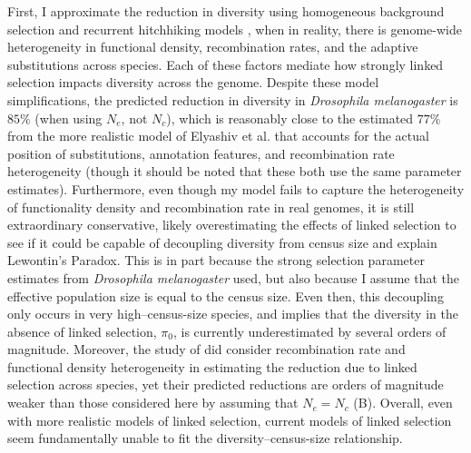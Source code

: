 \documentclass[9pt,lineno]{elife}
\begin{document}
First, I approximate the reduction in diversity using homogeneous background
selection and recurrent hitchhiking models
\citep{Kaplan1989-sc,Hudson1995-xc,Coop2012-cd}, when in reality, there is
genome-wide heterogeneity in functional density, recombination rates, and the
adaptive substitutions across species. Each of these factors mediate how
strongly linked selection impacts diversity across the genome. Despite these
model simplifications, the predicted reduction in diversity in \emph{Drosophila
melanogaster} is $85\%$ (when using $N_e$, not $N_c$), which is reasonably
close to the estimated $77\%$ from the more realistic model of Elyashiv et al.
that accounts for the actual position of substitutions, annotation features,
and recombination rate heterogeneity (though it should be noted that these both
use the same parameter estimates). Furthermore, even though my model fails to
capture the heterogeneity of functionality density and recombination rate in
real genomes, it is still extraordinary conservative, likely overestimating the
effects of linked selection to see if it could be capable of decoupling
diversity from census size and explain Lewontin's Paradox. This is in part
because the strong selection parameter estimates from \emph{Drosophila
melanogaster} used, but also because I assume that the effective population
size is equal to the census size.  Even then, this decoupling only occurs in
very high--census-size species, and implies that the diversity in the absence
of linked selection, $\pi_0$, is currently underestimated by several orders of
magnitude. Moreover, the study of \cite{Corbett-Detig2015-gt} did consider
recombination rate and functional density heterogeneity in estimating the
reduction due to linked selection across species, yet their predicted
reductions are orders of magnitude weaker than those considered here by
assuming that $N_e = N_c$ (B).
Overall, even with more realistic models of linked selection, current models of
linked selection seem fundamentally unable to fit the diversity--census-size
relationship.
\end{document}
